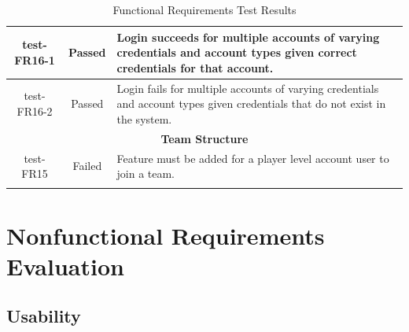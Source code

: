 \documentclass[12pt, titlepage]{article}
\begin{document}
\begin{longtable}{|c|c|p{8cm}|}
  \hline
  test-FR16-1 & Passed & Login succeeds for multiple accounts of varying credentials and account types given correct credentials for that account.\\
  \hline
  test-FR16-2 & Passed & Login fails for multiple accounts of varying credentials and account types given credentials that do not exist in the system.\\
  \hline
  \multicolumn{3}{|c|}{\textbf{Team Structure}} \\
  \hline
  test-FR15 & Failed & Feature must be added for a player level account user to join a team.\\
  \hline
  \caption{Functional Requirements Test Results}
\end{longtable}


\section{Nonfunctional Requirements Evaluation}

\subsection{Usability}
\end{document}

